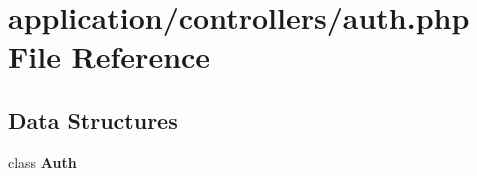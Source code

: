 \section{application/controllers/auth.php File Reference}
\label{auth_8php}
\subsection*{Data Structures}
\begin{DoxyCompactItemize}
\item 
class {\bf Auth}
\end{DoxyCompactItemize}
